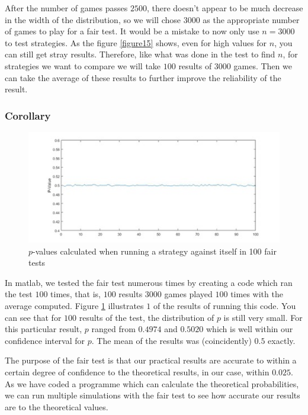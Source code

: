 \documentclass[a4paper,titlepage]{article}
\begin{document}
After the number of games passes $2500$, there doesn’t appear to be much decrease in the width of the distribution, so we will chose $3000$ as the appropriate number of games to play for a fair test. It would be a mistake to now only use $n=3000$ to test strategies. As the figure \ref{figure15} shows, even for high values for $n$, you can still get stray results. Therefore, like what was done in the test to find $n$, for strategies we want to compare we will take $100$ results of $3000$ games. Then we can take the average of these results to further improve the reliability of the result.
\subsubsection{Corollary}
\begin{figure}
\centering
\includegraphics[width=\textwidth]{stats_2}
\caption{$p$-values calculated when running a strategy against itself in 100 fair tests\label{figure16}}
\end{figure}
In matlab, we tested the fair test numerous times by creating a code which ran the test $100$ times, that is, $100$ results $3000$ games played $100$ times with the average computed. Figure \ref{figure16} illustrates $1$ of the results of running this code. You can see that for $100$ results of the test, the distribution of $p$ is still very small. For this particular result, $p$ ranged from $0.4974$ and $0.5020$ which is well within our confidence interval for $p$. The mean of the results was (coincidently) $0.5$ exactly.

The purpose of the fair test is that our practical results are accurate to within a certain degree of confidence to the theoretical results, in our case, within $0.025$. As we have coded a programme which can calculate the theoretical probabilities, we can run multiple simulations with the fair test to see how accurate our results are to the theoretical values.
\end{document}
